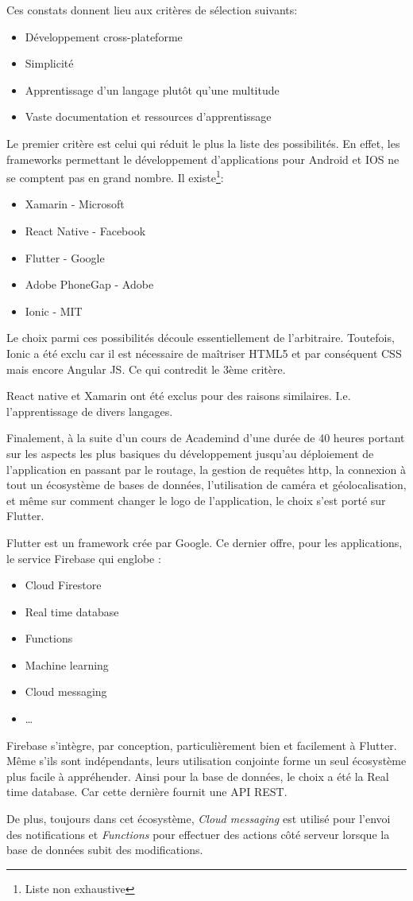Ces constats donnent lieu aux critères de sélection suivants:
\smallskip
\begin{itemize}
    \item Développement cross-plateforme
    \item Simplicité
    \item Apprentissage d'un langage plutôt qu'une multitude
    \item Vaste documentation et ressources d'apprentissage
\end{itemize}
\smallskip
Le premier critère est celui qui réduit le plus la liste des possibilités. En effet, les frameworks
permettant le développement d'applications pour Android et IOS ne se comptent pas en grand nombre. Il existe\footnote{Liste non exhaustive}:
\smallskip
\begin{itemize}
    \item Xamarin - Microsoft
    \item React Native - Facebook
    \item Flutter - Google
    \item Adobe PhoneGap - Adobe
    \item Ionic - MIT
\end{itemize}
\smallskip
Le choix parmi ces possibilités découle essentiellement de l'arbitraire. Toutefois, Ionic a été exclu car il est nécessaire de maîtriser HTML5 et par conséquent CSS mais encore Angular JS. Ce qui contredit le 3ème critère.

React native et Xamarin ont été exclus pour des raisons similaires. I.e. l'apprentissage de divers langages.

Finalement, à la suite d’un cours de Academind d'une durée de 40 heures portant sur les aspects les plus basiques du développement jusqu'au déploiement de l'application en passant par le routage, la gestion de requêtes http, la connexion à tout un écosystème de bases de données, l'utilisation de caméra et géolocalisation, et même sur comment changer le logo de l'application, le choix s'est porté sur Flutter.

Flutter est un framework crée par Google. Ce dernier offre, pour les applications, le service Firebase qui englobe :

\smallskip
\begin{itemize}
    \item Cloud Firestore
    \item Real time database
    \item Functions
    \item Machine learning
    \item Cloud messaging
    \item \dots
\end{itemize}
\smallskip
Firebase s'intègre, par conception, particulièrement bien et facilement à Flutter. Même s'ils sont
indépendants, leurs utilisation conjointe forme un seul écosystème plus facile à appréhender. Ainsi pour la
base de données, le choix a été la Real time database. Car cette dernière fournit une API REST.

De plus, toujours dans cet écosystème, \textit{Cloud messaging} est utilisé pour l'envoi des notifications et \textit{Functions} pour
effectuer des actions côté serveur lorsque la base de données subit des modifications.

